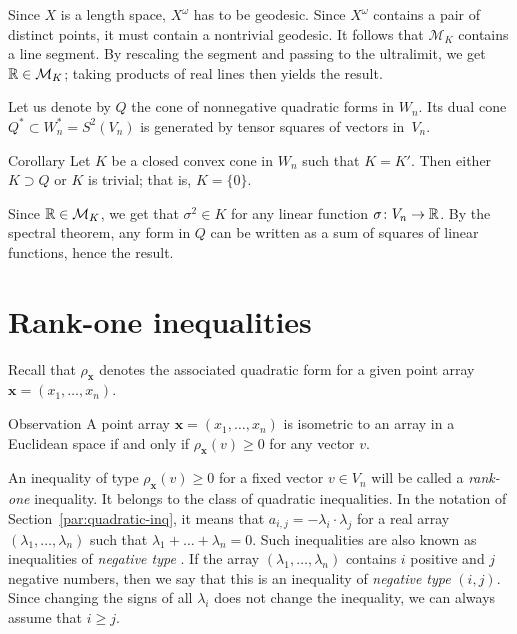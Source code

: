 Since $X$ is a length space, $X^\omega$ has to be geodesic.
Since $X^\omega$
contains a pair of distinct points, it must contain a nontrivial geodesic.
It follows that $\mathcal{M}_K$ contains a line segment.
By rescaling the segment and passing to the ultralimit, we get $\mathbb{R}\in \mathcal{M}_K$;
taking products of real lines then yields the result.
\qeds

Let us denote by $Q$ the cone of nonnegative quadratic forms in $W_n$.
Its dual cone $Q^*\subset W_n^*=S^2(V_n)$ is generated by tensor squares of vectors in~$V_n$.

\begin{thm}{Corollary}
Let $K$ be a closed convex cone in $W_n$ such that $K=K'$.
Then either $K\supset Q$ or $K$ is trivial; that is, $K=\{0\}$.
\end{thm}

Since $\mathbb{R}\in \mathcal{M}_K$, we get that $\sigma^2\in K$ for any linear function $\sigma\colon V_n\to\mathbb{R}$.
By the spectral theorem, any form in $Q$ can be written as a sum of squares of linear functions, hence the result.
\qeds

\section{Rank-one inequalities}\label{par:rank-one}
Recall that $\rho_{\bm{x}}$ denotes the associated quadratic form for a given point array $\bm{x}=(x_1,\ldots,x_n)$.

\begin{thm}{Observation}\label{obs:rank-one}
A point array $\bm{x}=(x_1,\ldots,x_n)$ is isometric to an array in a Euclidean space if and only if $\rho_{\bm{x}}(v)\geqslant 0$ for any vector $v$.
\end{thm}

An inequality of type $\rho_{\bm{x}}(v)\geqslant 0$ for a fixed vector $v\in V_n$ will be called a \emph{rank-one} inequality.
It belongs to the class of quadratic inequalities.  
In the notation of Section~\ref{par:quadratic-inq}, it means that $a_{i,j}=-\lambda_i\cdot\lambda_j$ for a real array $(\lambda_1,\ldots, \lambda_n)$ such that
$\lambda_1+\ldots+\lambda_n=0$.
Such inequalities are also known as inequalities of \emph{negative type} \cite{deza-lauren}.
If the array $(\lambda_1,\ldots, \lambda_n)$ contains $i$ positive and $j$ negative numbers,
then we say that this is an inequality of \emph{negative type} $(i,j)$.
Since changing the signs of all $\lambda_i$ does not change the inequality, we can always assume that $i\geqslant j$.

